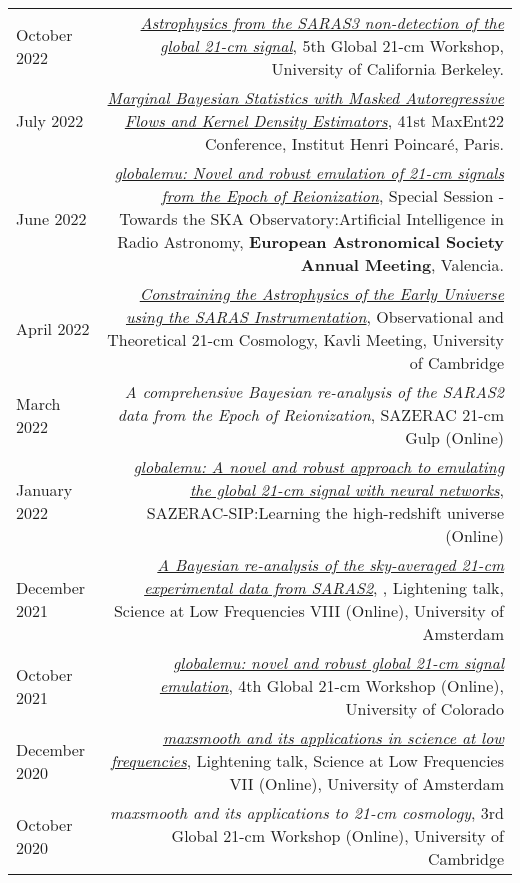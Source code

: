 \documentclass{article}
\begin{document}
\begin{tabular}{L!{\vrule}R}
    October 2022 & \href{https://global21cmworkshop.org/2022-berkeley/}{\textit{Astrophysics from the SARAS3 non-detection of the global 21-cm signal}}, 5th Global 21-cm Workshop, University of California Berkeley. \\
	July 2022 & \href{https://github.com/htjb/Talks/blob/master/Talks/MaxEnt22_margarine_June_2022/MaxEnt_slides.pdf}{\textit{Marginal Bayesian Statistics with Masked Autoregressive Flows and Kernel Density Estimators}}, 41st MaxEnt22 Conference, Institut Henri Poincar\'e, Paris. \\
	June 2022 & \href{https://github.com/htjb/Talks/blob/master/Talks/ESA_globalemu_July_2022/AUDITORIUM\%203A_SS23a_0940_Bevins.pdf}{\textit{globalemu: Novel and robust emulation of 21-cm signals from the Epoch of Reionization}}, Special Session - Towards the SKA Observatory:Artificial Intelligence in Radio Astronomy, \textbf{European Astronomical Society Annual Meeting}, Valencia. \\
	April 2022 & \href{https://www.kicc.cam.ac.uk/events/kavli-science-themed-meetings/observational-and-theoretical-21-cm-cosmology}{\textit{Constraining the Astrophysics of the Early Universe using the SARAS Instrumentation}}, Observational and Theoretical 21-cm Cosmology, Kavli Meeting, University of Cambridge \\
	March 2022 & \textit{A comprehensive Bayesian re-analysis of the SARAS2 data from the Epoch of Reionization}, SAZERAC 21-cm Gulp (Online) \\
	January 2022 & \href{https://www.youtube.com/watch?v=BFwia93NuAc&list=PLp95u5tgS_YUkFaLATBQpLajJzO5ljN5u&index=5}{\textit{globalemu: A novel and robust approach to emulating the global 21-cm signal with neural networks}}, SAZERAC-SIP:Learning the high-redshift universe (Online) \\
	December 2021 & \href{https://www.youtube.com/watch?v=93KCp7rHcGA&list=PLZL7YmXBBHPDCyNfJcWwP78GgacY_Og4E&index=23}{\textit{A Bayesian re-analysis of the sky-averaged 21-cm experimental data from SARAS2}}, , Lightening talk, Science at Low Frequencies VIII (Online), University of Amsterdam \\
	October 2021 & \href{https://www.youtube.com/watch?v=862NuVyF33k&list=PLF7c7ri2hrnGlwbn4JLc0PWbncSeARdTP&index=4}{\textit{globalemu: novel and robust global 21-cm signal emulation}}, 4th Global 21-cm Workshop (Online), University of Colorado \\
	December 2020 & \href{https://www.youtube.com/watch?v=Yw6_IInwTNE}{\textit{maxsmooth and its applications in science at low frequencies}}, Lightening talk, Science at Low Frequencies VII (Online), University of Amsterdam \\
	October 2020 & \textit{maxsmooth and its applications to 21-cm cosmology}, 3rd Global 21-cm Workshop (Online), University of Cambridge \\
\end{tabular}
\end{document}
